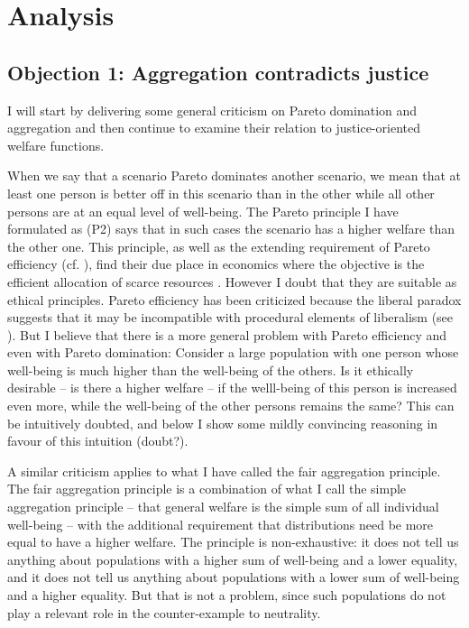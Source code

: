 \chapter{Analysis}
\section{Objection 1: Aggregation contradicts justice}

I will start by delivering some general criticism on Pareto domination and aggregation and then continue to examine their relation to justice-oriented welfare functions.  

When we say that a scenario Pareto dominates another scenario, we mean that at least one person is better off in this scenario than in the other while all other persons are at an equal level of well-being. The Pareto principle I have formulated as (P2) says that in such cases the scenario has a higher welfare than the other one. This principle, as well as the extending requirement of Pareto efficiency (cf. ), find their due place in economics where the objective is the efficient allocation of scarce resources \cite[p.~4]{samuelson_2010}. However I doubt that they are suitable as ethical principles. Pareto efficiency has been criticized because the liberal paradox suggests that it may be incompatible with procedural elements of liberalism (see \cite{sen_1997}). But I believe that there is a more general problem with Pareto efficiency and even with Pareto domination: Consider a large population with one person whose well-being is much higher than the well-being of the others. Is it ethically desirable – is there a higher welfare – if the welll-being of this person is increased even more, while the well-being of the other persons remains the same? This can be intuitively doubted, and below I show some mildly convincing reasoning in favour of this intuition (doubt?).  

A similar criticism applies to what I have called the fair aggregation principle. The fair aggregation principle is a combination of what I call the simple aggregation principle – that general welfare is the simple sum of all individual well-being – with the additional requirement that distributions need be more equal to have a higher welfare. The principle is non-exhaustive: it does not tell us anything about populations with a higher sum of well-being and a lower equality, and it does not tell us anything about populations with a lower sum of well-being and a higher equality. But that is not a problem, since such populations do not play a relevant role in the counter-example to neutrality.  


